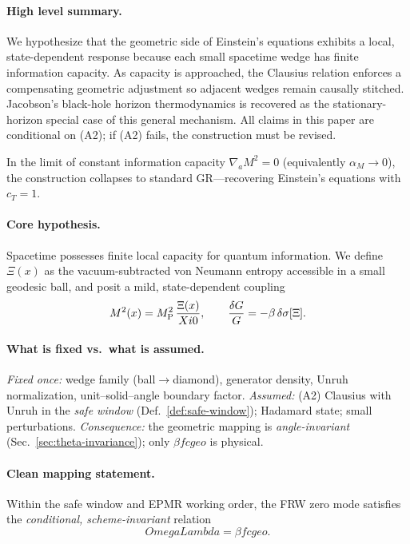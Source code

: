 \documentclass[aps,prd,onecolumn,superscriptaddress,nofootinbib]{revtex4-2}
\def\OmL{OmegaLambda}%
\def\cgeo{cgeo}%
\def\XiVac{Xi0}%
\newcommand{\OmL}{\Omega_\Lambda}
\newcommand{\cgeo}{c_{\rm geo}}
\newcommand{\XiVac}{\Xi_0}
\begin{document}
\paragraph{High level summary.}
We hypothesize that the geometric side of Einstein’s equations exhibits a local, state-dependent response because each small spacetime wedge has finite information capacity. As capacity is approached, the Clausius relation enforces a compensating geometric adjustment so adjacent wedges remain causally stitched. Jacobson’s black-hole horizon thermodynamics is recovered as the stationary-horizon special case of this general mechanism. All claims in this paper are conditional on (A2); if (A2) fails, the construction must be revised.

In the limit of constant information capacity \(\nabla_a M^2=0\) (equivalently \(\alpha_M\!\to\!0\)), the construction collapses to standard GR—recovering Einstein’s equations with \(c_T=1\).

\paragraph{Core hypothesis.}
Spacetime possesses finite local capacity for quantum information. We define \(\Xi(x)\) as the vacuum-subtracted von Neumann entropy accessible in a small geodesic ball, and posit a mild, state-dependent coupling
\begin{equation}
M^2(x) = M_{\rm P}^2 \, \frac{\Xi(x)}{\XiVac},\qquad \frac{\delta G}{G} = -\beta\,\delta\sigma[\Xi].
\end{equation}

\paragraph{What is fixed vs.\ what is assumed.}
\emph{Fixed once:} wedge family (ball\(\to\)diamond), generator density, Unruh normalization, unit–solid–angle boundary factor. \emph{Assumed:} (A2) Clausius with Unruh in the \emph{safe window} (Def.~\ref{def:safe-window}); Hadamard state; small perturbations. \emph{Consequence:} the geometric mapping is \emph{angle-invariant} (Sec.~\ref{sec:theta-invariance}); only \(\beta f \cgeo\) is physical.

\paragraph{Clean mapping statement.}
Within the safe window and EPMR working order, the FRW zero mode satisfies the \emph{conditional, scheme-invariant} relation
\begin{equation}
\OmL=\beta f \cgeo.
\end{equation}
\end{document}
